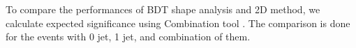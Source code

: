To compare the performances of BDT shape analysis and 2D method,
we calculate expected significance using Combination tool \cite{combine}. 
The comparison is done for the events with 0 jet, 1 jet, and combination of them.
